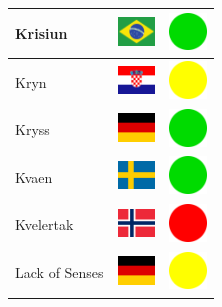 \documentclass[12pt, a4paper, twoside]{report}
\begin{document}
\begin{center}
\begin{longtable}{|p{5cm}|p{2cm}|p{2cm}|}
 Krisiun                                                    & \includegraphics[width=1cm]{../img/flags/br} &   \includegraphics[width=1cm]{../likes/y} \\ \hline
 Kryn                                                       & \includegraphics[width=1cm]{../img/flags/hr} &   \includegraphics[width=1cm]{../likes/m} \\ \hline
 Kryss                                                      & \includegraphics[width=1cm]{../img/flags/de} &   \includegraphics[width=1cm]{../likes/y} \\ \hline
 Kvaen                                                      & \includegraphics[width=1cm]{../img/flags/se} &   \includegraphics[width=1cm]{../likes/y} \\ \hline
 Kvelertak                                                  & \includegraphics[width=1cm]{../img/flags/no} &   \includegraphics[width=1cm]{../likes/n} \\ \hline
 Lack of Senses                                             & \includegraphics[width=1cm]{../img/flags/de} &   \includegraphics[width=1cm]{../likes/m} \\ \hline

\end{longtable}
\end{center}
\end{document}
